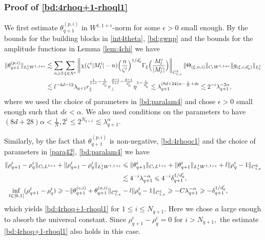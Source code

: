 \documentclass[10pt,a4paper]{amsart}
\numberwithin{equation}{section}
\def\({{\Big(}}
\def\){{\Big)}}
\newcommand{\norm}[1]{\left\|#1\right\|}
\def\geq{\geqslant}
\def\leq{\leqslant}
\def\({{\Big(}}
\def\){{\Big)}}
\def\geq{\geqslant}
\def\leq{\leqslant}
\begin{document}
\subsubsection{Proof of   \eqref{bd:4rhoq+1-rhoql1}}
We first estimate $\theta_{q+1}^{(p,i)}$ in $W^{1,1+\epsilon}$-norm for some $\epsilon>0$ small enough. By the bounds for the building blocks in \eqref{int4theta}, \eqref{bd:gwnp}  and the bounds for the amplitude functions in Lemma \ref{lem:4chi} we have
\begin{align*}
\|\theta_{q+1}^{(p,i)}\|_{L^1_tW^{1,1+\epsilon}}&\lesssim\sum_{n\geq3}\sum_{\xi\in\Lambda^{n}}\norm{\chi(\zeta^{i}|M^{i}_l|-n)\(\frac{n}{\zeta^{i}}\)^{1/d_0'}\Gamma_{\xi}\(\frac{M^{i}_l}{|M^{i}_l|}\)}_{C_{t,x}^1}\|\Theta_{(\xi,n,i)} \|_{C_tW^{1,1+\epsilon}}\|g_{(\xi,i,d_0')}\|_{L_t^1}\notag\\ 
&\lesssim l^{-4d-12}\lambda_{q+1}r_\parallel^{\frac1{1+\epsilon}-\frac{1}{d_0'}}r_\perp^{\frac{d-1}{1+\epsilon}-\frac{d-1}{d_0'}}\eta^{1-\frac1{d_0'}}%
\lesssim\lambda_{q+1}^{(8d+24)\alpha-\frac1N+d\epsilon}\lesssim2^{-i}\lambda_{q+1}^{-2\alpha} ,
\end{align*}
where we used the choice of parameters in \eqref{bd:paralam4} and  chose $\epsilon>0$ small enough such that $d\epsilon<\alpha$. We also used  conditions on the parameters to have $(8d+28)\alpha<\frac1N,2^i\leq2^{N_{q+1}}\lesssim\lambda_{q+1}^{\alpha}$. 

 
Similarly, by the fact that $\theta_{q+1}^{(p,i)}$ is non-negative, \eqref{bd:4rhoqc1} and the choice of parameters in \eqref{para42}, \eqref{bd:paralam4}  we have
\begin{align}
\|\rho^{i}_{q+1}-\rho^{i}_q\|_{C_tL^{1+\epsilon}}&+\|\rho^{i}_{q+1}-\rho^{i}_q\|_{L_t^1W^{1,1+\epsilon}}
\leq\|\theta^{i}_{q+1}\|_{C_tL^{1+\epsilon}}+\|\theta^{i}_{q+1}\|_{L_t^1W^{1,1+\epsilon}}+ l\|\rho_q^i-1\|_{C_{t,x}^2}\notag\\
&\qquad\qquad\qquad\qquad\qquad\lesssim4^{-i}\lambda_{q+1}^{-\alpha}\leq 4^{-i}\delta_{q+1}^{1/d_0'},\notag\\
    \inf_{t\in [0,1]}(\rho^{i}_{q+1} - \rho^{i}_q)&\geq-\|\theta_{q+1}^{(c,i)}+\theta
_{q+1}^{(o,i)}\|_{C_{t,x}^0} -l\|\rho_q^i-1\|_{C_{t,x}^1}\geq -C\lambda_{q+1}^{-\alpha} \geq -\delta_{q+1}^{1/d_0'},\notag
\end{align}
which yields \eqref{bd:4rhoq+1-rhoql1} for $1\leq i\leq N_{q+1}$.  Here we chose $a$ large enough to absorb the universal constant. Since
$
\rho_{q+1}^i-\rho_q^i=0
$
for
$
i>N_{q+1},
$
the estimate \eqref{bd:4rhoq+1-rhoql1} also holds in this case.
\end{document}

